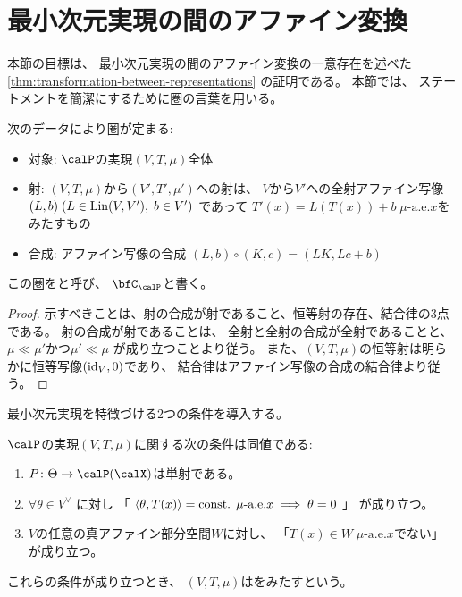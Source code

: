 \documentclass[report]{jlreq}
\begin{document}
\section{最小次元実現の間のアファイン変換}

本節の目標は、
最小次元実現の間のアファイン変換の一意存在を述べた
\cref{thm:transformation-between-representations}
の証明である。
本節では、
ステートメントを簡潔にするために圏の言葉を用いる。

\begin{propdef}
    次のデータにより圏が定まる:
    \begin{itemize}
        \item 対象: $\calP$の実現$(V, T, \mu)$全体
        \item 射: $(V, T, \mu)$から$(V', T', \mu')$への射は、
            $V$から$V'$への全射アファイン写像
            $(L, b) \; (L \in \operatorname{Lin}(V, V'), \; b \in V')$
            であって
            $T'(x) = L(T(x)) + b \; \text{$\mu$-a.e.$x$}$をみたすもの
        \item 合成: アファイン写像の合成
            $(L, b) \circ (K, c) = (LK, Lc + b)$
    \end{itemize}
    この圏をと呼び、
    $\bfC_\calP$と書く。
\end{propdef}

\begin{proof}
    示すべきことは、射の合成が射であること、恒等射の存在、結合律の3点である。
    射の合成が射であることは、
    全射と全射の合成が全射であることと、
    $\mu \ll \mu'$かつ$\mu' \ll \mu$
    が成り立つことより従う。
    また、$(V, T, \mu)$の恒等射は明らかに恒等写像$(\mathrm{id}_V, 0)$であり、
    結合律はアファイン写像の合成の結合律より従う。
\end{proof}

最小次元実現を特徴づける2つの条件を導入する。

\begin{propdef}[条件A]
    $\calP$の実現$(V, T, \mu)$に関する次の条件は同値である:
    \begin{enumerate}
        \item $P \colon \Theta \to \calP(\calX)$は単射である。
        \item $\forall \theta \in V^\vee$
            に対し
            「
                $\left\langle{\theta},{T(x)}\right\rangle = \text{const. $\mu$-a.e.$x$}
                \implies
                \theta = 0$
            」
            が成り立つ。
        \item $V$の任意の真アファイン部分空間$W$に対し、
            「$T(x) \in W \; \text{$\mu$-a.e.$x$}$でない」
            が成り立つ。
    \end{enumerate}
    これらの条件が成り立つとき、
    $(V, T, \mu)$はをみたすという。
\end{propdef}
\end{document}
